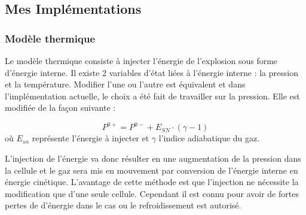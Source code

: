 %

\subsection{Mes Implémentations}
\label{sec:SNmodel}

\subsubsection{Modèle thermique}
Le modèle thermique consiste à injecter l’énergie de l'explosion sous forme d’énergie interne.
Il existe 2 variables d’état liées à l’énergie interne : la pression et la température.
Modifier l'une ou l'autre est équivalent et dans l’implémentation actuelle, le choix a été fait de travailler sur la pression.
Elle est modifiée de la façon suivante :

\begin{equation}
P^{0+} = P^{0-}  + E_{SN} \cdot  (\gamma-1)
\end{equation}
où $E_{sn}$ représente l'énergie à injecter et $\gamma$ l'indice adiabatique du gaz.

L'injection de l'énergie va donc résulter en une augmentation de la pression dans la cellule et le gaz sera mis en mouvement par conversion de l'énergie interne en énergie cinétique. 
L'avantage de cette méthode est que l'injection ne nécessite la modification que d'une seule cellule.
Cependant il est connu pour avoir de fortes pertes de d'énergie dans le cas ou le refroidissement est autorisé. %

